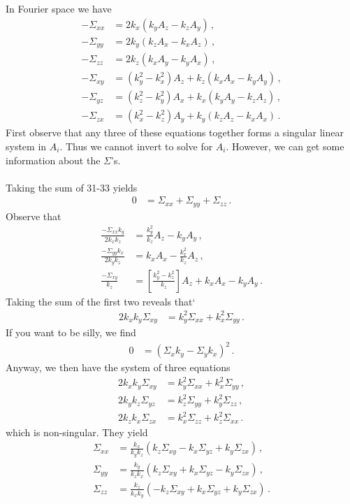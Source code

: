 \documentclass{article}
\newcommand*\p[1]{\left(#1\right)}
\newcommand*\ps[1]{\left[#1\right]}
\newcommand*\f[2]{\frac{#1}{#2}}
\begin{document}
\\\\
In Fourier space we have
\begin{align}
-\Sigma_{xx}&=2k_x(k_y A_z-k_z A_y)\,,\\
-\Sigma_{yy}&=2k_y(k_z A_x-k_x A_z)\,,\\
-\Sigma_{zz}&=2k_z(k_x A_y-k_y A_x)\,,\\
-\Sigma_{xy}&=(k_y^2-k_x^2) A_z+k_z(k_x A_x-k_y A_y)\,,\\
-\Sigma_{yz}&=(k_z^2-k_y^2) A_x+k_x(k_y A_y-k_z A_z)\,,\\
-\Sigma_{zx}&=(k_x^2-k_z^2) A_y+k_y(k_z A_z-k_x A_x)\,.
\end{align}
First observe that any three of these equations together forms a singular linear system in $A_i$. Thus we cannot invert to solve for $A_i$. However, we can get some information about the $\Sigma$'s.
\\\\
Taking the sum of 31-33 yields
\begin{align}
0&=\Sigma_{xx}+\Sigma_{yy}+\Sigma_{zz}\,.
\end{align}
Observe that
\begin{align}
\f{-\Sigma_{xx}k_y}{2k_xk_z}&=\f{k_y^2}{k_z}A_z-k_yA_y\,,\\
\f{-\Sigma_{yy}k_x}{2k_yk_z}&=k_xA_x-\f{k_x^2}{k_z}A_z\,,\\
\f{-\Sigma_{xy}}{k_z}&=\ps{\f{k_y^2-k_z^2}{k_z}}A_z+k_xA_x-k_yA_y\,.
\end{align}
Taking the sum of the first two reveals that`
\begin{align}
2k_xk_y\Sigma_{xy}&=k_y^2\Sigma_{xx}+k_x^2\Sigma_{yy}\,.
\end{align}
If you want to be silly, we find
\begin{align}
0&=(\Sigma_{x}k_y-\Sigma_{y}k_x)^2\,.
\end{align}
Anyway, we then have the system of three equations
\begin{align}
2k_xk_y\Sigma_{xy}&=k_y^2\Sigma_{xx}+k_x^2\Sigma_{yy}\,,\\
2k_yk_z\Sigma_{yz}&=k_z^2\Sigma_{yy}+k_y^2\Sigma_{zz}\,,\\
2k_zk_x\Sigma_{zx}&=k_x^2\Sigma_{zz}+k_z^2\Sigma_{xx}\,.
\end{align}
which is non-singular. They yield
\begin{align}
\Sigma_{xx}&=\f{k_x}{k_yk_z}\p{k_z\Sigma_{xy}-k_x\Sigma_{yz}+k_y\Sigma_{zx}}\,,\\
\Sigma_{yy}&=\f{k_y}{k_zk_x}\p{k_z\Sigma_{xy}+k_x\Sigma_{yz}-k_y\Sigma_{zx}}\,,\\
\Sigma_{zz}&=\f{k_z}{k_xk_y}\p{-k_z\Sigma_{xy}+k_x\Sigma_{yz}+k_y\Sigma_{zx}}\,.
\end{align}
\end{document}
